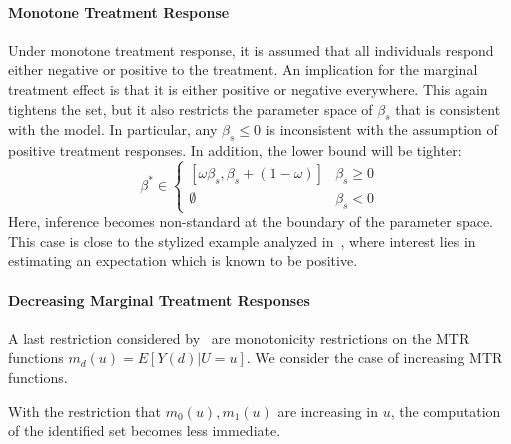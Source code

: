 \documentclass[12pt,a4paper,english]{article} %
\numberwithin{equation}{section}
\theoremstyle{definition}
\theoremstyle{remark}
\theoremstyle{plain}
\begin{document}
\paragraph{Monotone Treatment Response}
Under monotone treatment response, it is assumed that all individuals respond either negative or positive to the treatment.
An implication for the marginal treatment effect is that it is either positive or negative everywhere.
This again tightens the set, but it also restricts the parameter space of $\beta_s$ that is consistent with the model.
In particular, any $\beta_s \leq 0$ is inconsistent with the assumption of positive treatment responses.
In addition, the lower bound will be tighter:
\begin{equation*}
  \beta^* \in \begin{cases}
    [\omega\beta_s, \beta_s + (1 - \omega)] & \beta_s \geq 0 \\
    \emptyset & \beta_s < 0
  \end{cases}
\end{equation*}
Here, inference becomes non-standard at the boundary of the parameter space.
This case is close to the stylized example analyzed in~\cite{andrews1999estimation}, where interest lies in estimating an expectation which is known to be positive.

\paragraph{Decreasing Marginal Treatment Responses}
A last restriction considered by~\cite{mogstad2018using} are monotonicity restrictions on the MTR functions $m_d(u) = E[Y(d)|U=u]$.
We consider the case of increasing MTR functions.

With the restriction that $m_0(u), m_1(u)$ are increasing in $u$, the computation of the identified set becomes less immediate.
\end{document}
